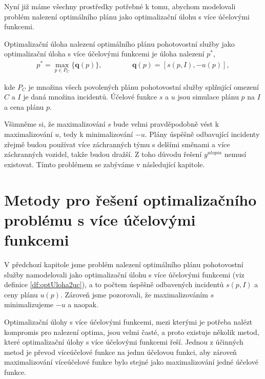 Nyní již máme všechny prostředky potřebné k tomu, abychom modelovali problém nalezení optimálního plánu jako optimalizační úlohu s více účelovými funkcemi. 
\begin{definice}\label{df:optUloha2uc}
  Optimalizační úloha nalezení optimálního plánu pohotovostní služby jako optimalizační úloha s více účelovými funkcemi je úloha nalezení $p^*$,
  \begin{align*}
    p^* = \max_{p \in P_C} \{ \mathbf{q}(p) \}, \hspace{50pt} \mathbf{q}(p) = [s(p, I), -u(p)],
  \end{align*}

  kde $P_C$ je množina všech povolených plánu pohotovostní služby splňující omezení $C$ a $I$ je daná množina incidentů.
  Účelové funkce $s$ a $u$ jsou simulace plánu $p$ na $I$ a cena plánu $p$.
\end{definice}

Všimněme si, že maximalizování $s$ bude velmi pravděpodobně vést k maximalizování $u$, tedy k minimalizování $-u$.
Plány úspěšně odbavující incidenty zřejmě budou používat více záchranných týmu s delšími směnami a více záchranných vozidel, takže budou dražší.
Z toho důvodu řešení $y^{utopia}$ nemusí existovat. Tímto problémem se zabýváme v následující kapitole.

\section{Metody pro řešení optimalizačního problému s více účelovými funkcemi}\label{kap:metodyProReseniOptSViceUcel}

V předchozí kapitole jsme problém nalezení optimálního plánu pohotovostní služby namodelovali jako optimalizační úlohu s více účelovými funkcemi (viz definice \ref{df:optUloha2uc}),
a to počtem úspěšně odbavených incidentů $s(p, I)$ a ceny plánu $u(p)$.
Zároveň jsme pozorovali, že maximalizováním $s$ minimalizujeme $-u$ a naopak.

Optimalizační úlohy s více účelovými funkcemi, mezi kterými je potřeba nalézt kompromis pro nalezení optima, jsou velmi časté,
a proto existuje několik metod, které optimalizační úlohy s více účelovými funkcemi řeší.
Jednou z účinných metod je převod víceúčelové funkce na jednu účelovou funkci, aby
zároveň maximalizování víceúčelové funkce bylo stejné jako maximalizování jedné účelové funkce.

